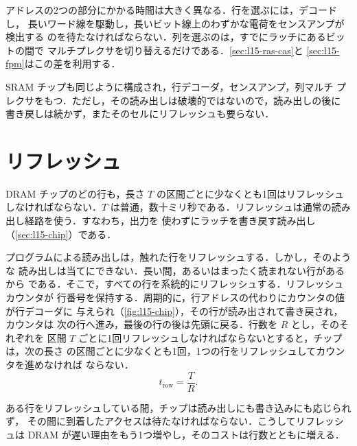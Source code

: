 \documentclass[../main.tex]{subfiles}
\begin{document}
アドレスの2つの部分にかかる時間は大きく異なる．行を選ぶには，デコードし，
長いワード線を駆動し，長いビット線上のわずかな電荷をセンスアンプが検出する
のを待たなければならない．列を選ぶのは，すでにラッチにあるビットの間で
マルチプレクサを切り替えるだけである．\cref{sec:l15-ras-cas}と
\cref{sec:l15-fpm}はこの差を利用する．

\begin{note}
  SRAM チップも同じように構成され，行デコーダ，センスアンプ，列マルチ
  プレクサをもつ．ただし，その読み出しは破壊的ではないので，読み出しの後に
  書き戻しは続かず，またそのセルにリフレッシュも要らない．
\end{note}

\section{リフレッシュ}
\label{sec:l15-refresh}

DRAM チップのどの行も，長さ $T$ の区間ごとに少なくとも1回はリフレッシュ
しなければならない．$T$ は普通，数十ミリ秒である．リフレッシュは通常の読み出し経路を使う．すなわち，出力を
使わずにラッチを書き戻す読み出し（\cref{sec:l15-chip}）である．

プログラムによる読み出しは，触れた行をリフレッシュする．しかし，そのような
読み出しは当てにできない．長い間，あるいはまったく読まれない行があるから
である．そこで，すべての行を系統的にリフレッシュする．リフレッシュカウンタが
行番号を保持する．周期的に，行アドレスの代わりにカウンタの値が行デコーダに
与えられ（\cref{fig:l15-chip}），その行が読み出されて書き戻され，カウンタは
次の行へ進み，最後の行の後は先頭に戻る．行数を $R$ とし，そのそれぞれを
区間 $T$ ごとに1回リフレッシュしなければならないとすると，チップは，次の長さ
の区間ごとに少なくとも1回，1つの行をリフレッシュしてカウンタを進めなければ
ならない．
\begin{equation}
  t_{\text{row}} = \frac{T}{R} .
  \label{eq:l15-refresh}
\end{equation}

ある行をリフレッシュしている間，チップは読み出しにも書き込みにも応じられず，
その間に到着したアクセスは待たなければならない．こうしてリフレッシュは
DRAM が遅い理由をもう1つ増やし，そのコストは行数とともに増える．
\end{document}
